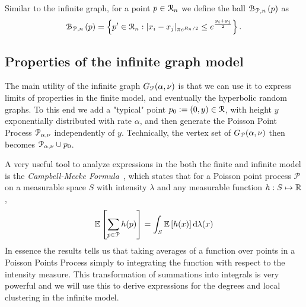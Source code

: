 Similar to the infinite graph, for a point $p \in {\mathcal R}_n$ we define the ball ${\mathcal B}_{{\mathcal P},n}\left(p\right)$ as
\begin{equation}\label{eq:def_ball_P_n}
	{\mathcal B}_{{\mathcal P},n}\left(p\right) = 
	\left\{p^\prime \in {\mathcal R}_n : |x_i - x_j|_{\pi e^{R_n/2}} \leq e^{\frac{y_i + y_j}{2}}\right\}.
\end{equation}



\subsection{Properties of the infinite graph model}

The main utility of the infinite graph $G_{{\mathcal P}}(\alpha, \nu)$ is that we can use it to express limits of properties in the finite model, and eventually the hyperbolic random graphs. To this end we add a "typical" point $p_0 := (0,y) \in {\mathcal R}$, with height $y$ exponentially distributed with rate $\alpha$, and then generate the Poisson Point Process ${\mathcal P}_{\alpha, \nu}$ independently of $y$. Technically, the vertex set of $G_{{\mathcal P}}(\alpha,\nu)$ then becomes ${\mathcal P}_{\alpha, \nu} \cup p_0$. 

A very useful tool to analyze expressions in the both the finite and infinite model is the \emph{Campbell-Mecke Formula}~\cite[Theorem 3.2]{baddeley2007spatial}, which states that for a Poisson point process $\mathcal{P}$ on a measurable space $S$ with intensity $\lambda$ and any measurable function $h : S \mapsto {\ensuremath{\mathbb R}}$,
\begin{equation}\label{eq:def_Campbell-Mecke}
	\mathbb{E}\left[\sum_{p \in {\mathcal P}} h(p)\right] = \int_S \mathbb{E}\left[h(x)\right] \operatorname{\mathrm{d}\hspace{-2pt}} \lambda(x)
\end{equation}
In essence the results tells us that taking averages of a function over points in a Poisson Points Process simply to integrating the function with respect to the intensity measure. This transformation of summations into integrals is very powerful and we will use this to derive expressions for the degrees and local clustering in the infinite model.

